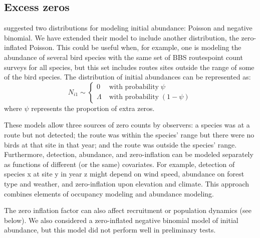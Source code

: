 \documentclass[12pt]{article}
\begin{document}
\subsection{Excess zeros}

\citet{dail_madsen:2011} suggested two distributions for modeling
initial abundance: Poisson and negative binomial.  We have extended
their model to include another distribution, the zero-inflated
Poisson.  This could be useful when, for example, one is modeling the
abundance of several bird species with the same set of BBS routespoint
count surveys for all species, but this set includes routes sites
outside the range of some of the bird species.  The distribution of
initial abundances can be represented as:
\begin{equation}
N_{i1} \sim \left\{
\begin{aligned}
0 &\; \text{with probability} \; \psi \\
\Lambda &\; \text{with probability} \; (1-\psi)
\end{aligned} \right.
\label{eq:ZIP}
\end{equation}
where $\psi$ represents the proportion of extra zeros.

These models allow three sources of zero counts by observers: a
species was at a route but not detected; the route was within the
species' range but there were no birds at that site in that year; and
the route was outside the species' range.  Furthermore, detection,
abundance, and zero-inflation can be modeled separately as functions
of different (or the same) covariates.  For example, detection of
species x at site y in year z might depend on wind speed, abundance on
forest type and weather, and zero-inflation upon elevation and
climate.  This approach combines elements of occupancy modeling
\citep{mackenzie_etal:2006} and abundance modeling.

The zero inflation factor can also affect
recruitment or population dynamics (see below).
We also considered a zero-inflated negative binomial model of initial
abundance, but this model did not perform well in preliminary tests.

\end{document}
